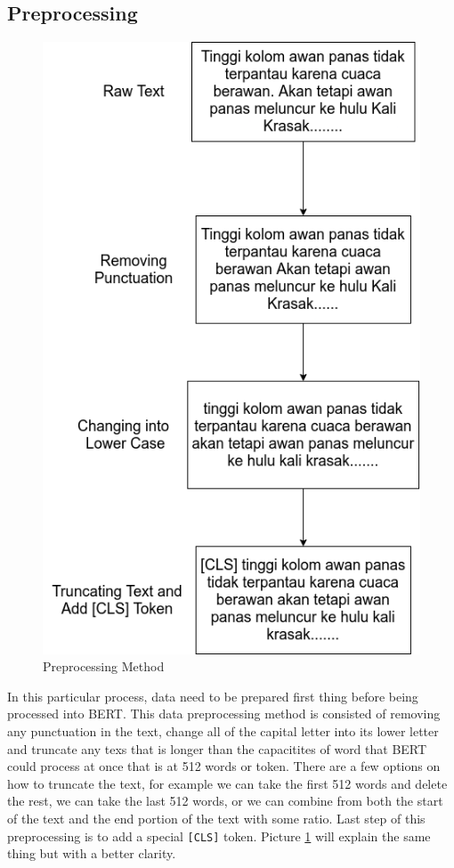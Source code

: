 \subsection{Preprocessing}

\begin{figure}[h!]
    \begin{center}
        \includegraphics[width= .7\linewidth]{gambar/preprocess_long_en.png}
        \caption{Preprocessing Method}
        \label{fig: metodologi_preprocessing}
    \end{center}
\end{figure}

In this particular process, data need to be prepared first thing before being processed into BERT. This data preprocessing method is consisted of removing any punctuation in the text, change all of the capital letter into its lower letter and truncate any texs that is longer than the capacitites of word that BERT could process at once that is at 512 words or token. There are a few options on how to truncate the text, for example we can take the first 512 words and delete the rest, we can take the last 512 words, or we can combine from both the start of the text and the end portion of the text with some ratio. Last step of this preprocessing is to add a special \texttt{[CLS]} token. Picture \ref{fig: metodologi_preprocessing} will explain the same thing but with a better clarity.

